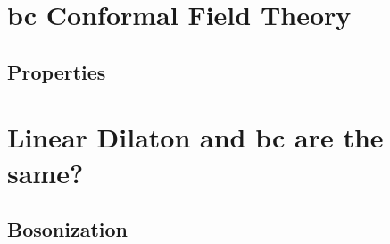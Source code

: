 




\section{bc Conformal Field Theory}

\subsection{Properties}

\section{Linear Dilaton and bc are the same?}

\subsection{Bosonization}


